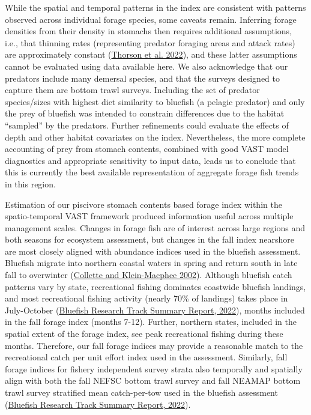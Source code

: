 \documentclass[
]{article}
\begin{document}
While the spatial and temporal patterns in the index are consistent with patterns observed across individual forage species, some caveats remain. Inferring forage densities from their density in stomachs then requires additional assumptions, i.e., that thinning rates (representing predator foraging areas and attack rates) are approximately constant (\protect\hyperlink{ref-thorson_diet_2022}{Thorson et al. 2022}), and these latter assumptions cannot be evaluated using data available here. We also acknowledge that our predators include many demersal species, and that the surveys designed to capture them are bottom trawl surveys. Including the set of predator species/sizes with highest diet similarity to bluefish (a pelagic predator) and only the prey of bluefish was intended to constrain differences due to the habitat ``sampled'' by the predators. Further refinements could evaluate the effects of depth and other habitat covariates on the index. Nevertheless, the more complete accounting of prey from stomach contents, combined with good VAST model diagnostics and appropriate sensitivity to input data, leads us to conclude that this is currently the best available representation of aggregate forage fish trends in this region.

Estimation of our piscivore stomach contents based forage index within the spatio-temporal VAST framework produced information useful across multiple management scales. Changes in forage fish are of interest across large regions and both seasons for ecosystem assessment, but changes in the fall index nearshore are most closely aligned with abundance indices used in the bluefish assessment. Bluefish migrate into northern coastal waters in spring and return south in late fall to overwinter (\protect\hyperlink{ref-collette_bigelow_2002}{Collette and Klein-Macphee 2002}). Although bluefish catch patterns vary by state, recreational fishing dominates coastwide bluefish landings, and most recreational fishing activity (nearly 70\% of landings) takes place in July-October (\href{https://apps-nefsc.fisheries.noaa.gov/saw/sasi_files.php?year=2022\&species_id=32\&stock_id=6\&review_type_id=5\&info_type_id=-1\&map_type_id=\&filename=Bluefish_SAW_SARC_2022_FINAL.pdf}{Bluefish Research Track Summary Report, 2022}), months included in the fall forage index (months 7-12). Further, northern states, included in the spatial extent of the forage index, see peak recreational fishing during these months. Therefore, our fall forage indices may provide a reasonable match to the recreational catch per unit effort index used in the assessment. Similarly, fall forage indices for fishery independent survey strata also temporally and spatially align with both the fall NEFSC bottom trawl survey and fall NEAMAP bottom trawl survey stratified mean catch-per-tow used in the bluefish assessment (\href{https://apps-nefsc.fisheries.noaa.gov/saw/sasi_files.php?year=2022\&species_id=32\&stock_id=6\&review_type_id=5\&info_type_id=-1\&map_type_id=\&filename=Bluefish_SAW_SARC_2022_FINAL.pdf}{Bluefish Research Track Summary Report, 2022}).
\end{document}
